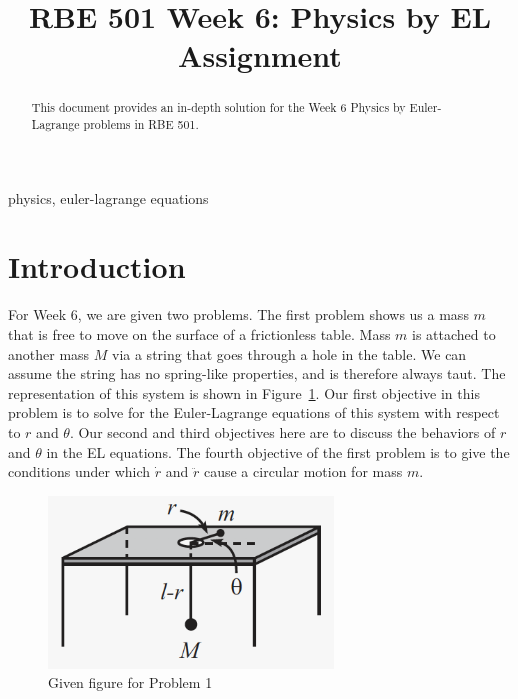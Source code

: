\documentclass[conference]{IEEEtran}
\begin{document}
\title{RBE 501 Week 6: Physics by EL Assignment}

\author{
}

\maketitle

\begin{abstract}
This document provides an in-depth solution for the Week 6 Physics by Euler-Lagrange problems in RBE 501.\\
\end{abstract}

\begin{IEEEkeywords}
physics, euler-lagrange equations
\end{IEEEkeywords}

\section{Introduction}
For Week 6, we are given two problems. The first problem shows us a mass $m$ that is free to
move on the surface of a frictionless table. Mass $m$ is attached to another mass $M$ via a
string that goes through a hole in the table. We can assume the string has no spring-like
properties, and is therefore always taut. The representation of this system is shown in 
Figure~\ref{problem-1-given-fig}. Our first objective in this problem is to solve for the Euler-Lagrange
equations of this system with respect to $r$ and $\theta$. Our second and third objectives here
are to discuss the behaviors of $r$ and $\theta$ in the EL equations. The fourth objective of the
first problem is to give the conditions under which $\dot{r}$ and $\ddot{r}$ cause a circular motion
for mass $m$.\\

\begin{figure}[h!]
    \centering
    \includegraphics[scale=0.35]{problem-1-given-fig.png}
    \caption{Given figure for Problem 1}
    \label{problem-1-given-fig}
\end{figure}
\end{document}
